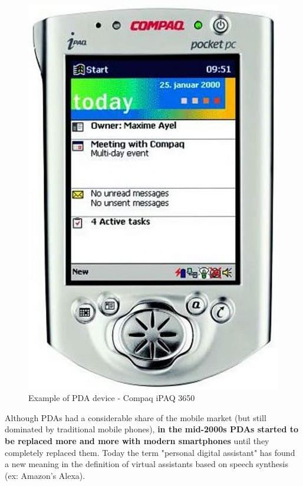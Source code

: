 \begin{figure}[!ht]
    \centering
    \includegraphics[scale=0.3]{document/chapters/chapter_1/images/compaq_ipaq_3650.jpg}
    \caption{Example of PDA device - Compaq iPAQ 3650}
    \label{fig:compaq_ipaq_3650}
\end{figure}

Although PDAs had a considerable share of the mobile market (but still dominated by traditional mobile phones), \textbf{in the mid-2000s PDAs started to be replaced more and more with modern smartphones} until they completely replaced them.
Today the term "personal digital assistant" has found a new meaning in the definition of virtual assistants based on speech synthesis (ex: Amazon's Alexa).

